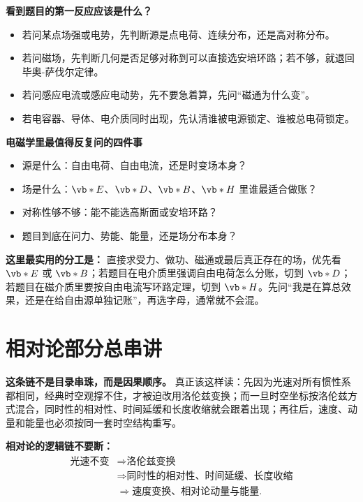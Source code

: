 \documentclass[lang=cn,11pt]{elegantbook}
\begin{document}
\textbf{看到题目的第一反应应该是什么？}
\begin{itemize}
 \item 若问某点场强或电势，先判断源是点电荷、连续分布，还是高对称分布。
 \item 若问磁场，先判断几何是否足够对称到可以直接选安培环路；若不够，就退回毕奥-萨伐尔定律。
 \item 若问感应电流或感应电动势，先不要急着算，先问“磁通为什么变”。
 \item 若电容器、导体、电介质同时出现，先认清谁被电源锁定、谁被总电荷锁定。
\end{itemize}

\textbf{电磁学里最值得反复问的四件事}
\begin{itemize}
 \item 源是什么：自由电荷、自由电流，还是时变场本身？
 \item 场是什么：\(\vb*{E}\)、\(\vb*{D}\)、\(\vb*{B}\)、\(\vb*{H}\) 里谁最适合做账？
 \item 对称性够不够：能不能选高斯面或安培环路？
 \item 题目到底在问力、势能、能量，还是场分布本身？
\end{itemize}

\begin{note}
\textbf{这里最实用的分工是：} 直接求受力、做功、磁通或最后真正存在的场，优先看 \(\vb*{E}\) 或 \(\vb*{B}\)；若题目在电介质里强调自由电荷怎么分账，切到 \(\vb*{D}\)；若题目在磁介质里要按自由电流写环路定理，切到 \(\vb*{H}\)。先问“我是在算总效果，还是在给自由源单独记账”，再选字母，通常就不会混。
\end{note}

\section{相对论部分总串讲}

\textbf{这条链不是目录串珠，而是因果顺序。} 真正该这样读：先因为光速对所有惯性系都相同，经典时空观撑不住，才被迫改用洛伦兹变换；而一旦时空坐标按洛伦兹方式混合，同时性的相对性、时间延缓和长度收缩就会跟着出现；再往后，速度、动量和能量也必须按同一套时空结构重写。

\textbf{相对论的逻辑链不要断：}
\[
\begin{aligned}
\text{光速不变}
&\Longrightarrow
\text{洛伦兹变换}\\
&\Longrightarrow
\text{同时性的相对性、时间延缓、长度收缩}\\
&\Longrightarrow
\text{速度变换、相对论动量与能量}.
\end{aligned}
\]
\end{document}
